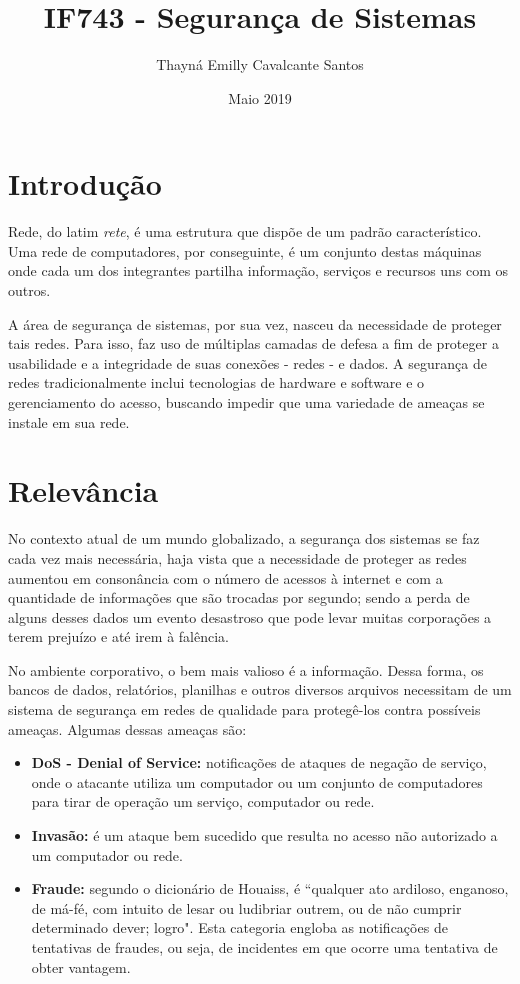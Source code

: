 \documentclass{article}[10pt]
\title{\textbf{IF743 - Segurança de Sistemas}}
\author{Thayná Emilly Cavalcante Santos}
\date{Maio 2019}
\begin{document}
\maketitle

\section{Introdução}
\noindent

Rede, do latim \textit{rete}, é uma estrutura que dispõe de um padrão característico. Uma rede de computadores, por conseguinte, é um conjunto destas máquinas onde cada um dos integrantes partilha informação, serviços e recursos uns com os outros.\citep{1} 

A área de segurança de sistemas, por sua vez, nasceu da necessidade de proteger tais redes. Para isso, faz uso de múltiplas camadas de defesa a fim de proteger a usabilidade e a integridade de suas conexões - redes - e dados. A segurança de redes tradicionalmente inclui tecnologias de hardware e software e o gerenciamento do acesso, buscando impedir que uma variedade de ameaças se instale em sua rede.\citep{2}

\section{Relevância}
\noindent

No contexto atual de um mundo globalizado, a segurança dos sistemas se faz cada vez mais necessária, haja vista que a necessidade de proteger as redes aumentou em consonância com o número de acessos à internet e com a quantidade de informações que são trocadas por segundo; sendo a perda de alguns desses dados um evento desastroso que pode levar muitas corporações a terem prejuízo e até irem à falência.

No ambiente corporativo, o bem mais valioso é a informação. Dessa forma, os bancos de dados, relatórios, planilhas e outros diversos arquivos necessitam de um sistema de segurança em redes de qualidade para protegê-los contra possíveis ameaças.
Algumas dessas ameaças são\citep{four}:
 \begin{itemize}
   \item \textbf{DoS - Denial  of  Service:} notificações  de  ataques  de  negação  de  serviço, onde  o  atacante  utiliza  um  computador  ou  um  conjunto  de  computadores  para tirar de operação um serviço, computador ou rede.
   \item \textbf{Invasão:} é um  ataque  bem  sucedido  que  resulta  no  acesso  não autorizado  a  um computador ou rede.
   \item \textbf{Fraude:} segundo o dicionário de Houaiss,  é ``qualquer  ato  ardiloso,  enganoso,  de  má-fé,  com intuito  de  lesar  ou  ludibriar  outrem,  ou  de  não  cumprir  determinado  dever; logro".  Esta  categoria  engloba  as  notificações  de  tentativas  de  fraudes,  ou  seja, de incidentes em que ocorre uma tentativa de obter vantagem. 
 \end{itemize}
\end{document}
